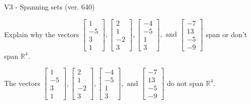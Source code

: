 \begin{exercise}
  \begin{exerciseTitle}V3 - Spanning sets (ver. 640)\end{exerciseTitle}
  \begin{exerciseStatement}
    Explain why the vectors \(\left[\begin{array}{r}
1 \\
-5 \\
3 \\
1
\end{array}\right] , \left[\begin{array}{r}
2 \\
1 \\
-2 \\
3
\end{array}\right] , \left[\begin{array}{r}
-4 \\
-5 \\
1 \\
3
\end{array}\right] , \text{ and } \left[\begin{array}{r}
-7 \\
13 \\
-5 \\
-9
\end{array}\right]\) span or don't span \(\mathbb{R}^4\). 
	


  \end{exerciseStatement}
  \begin{exerciseAnswer}
   The vectors \(\left[\begin{array}{r}
1 \\
-5 \\
3 \\
1
\end{array}\right] , \left[\begin{array}{r}
2 \\
1 \\
-2 \\
3
\end{array}\right] , \left[\begin{array}{r}
-4 \\
-5 \\
1 \\
3
\end{array}\right] , \text{ and } \left[\begin{array}{r}
-7 \\
13 \\
-5 \\
-9
\end{array}\right]\) 
  	 do not  
	span \(\mathbb{R}^4\).
  


  \end{exerciseAnswer}
\end{exercise}